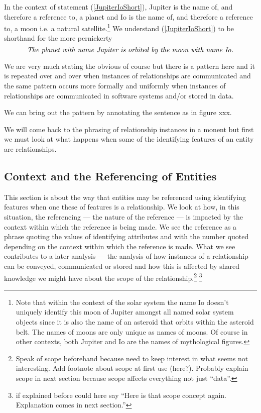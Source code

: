 In the context of statement (\ref{JupiterIoShort}), Jupiter is the name of, and therefore  a reference to, a planet and  Io is the name of, and therefore a reference to, a moon i.e. a natural satellite.\footnote{
Note that within the context of the solar system the name Io  doesn't uniquely identify this moon of Jupiter amongst all named solar system objects since it is also the name of an asteroid that orbits within the asteroid belt.
The names of moons are only unique as names of moons. 
Of course in other contexts, both Jupiter and Io are the names of mythological figures.
} 
We understand  (\ref{JupiterIoShort}) to be shorthand for the 
more pernickerty 
\begin{equation}
\mbox{\textit{The planet with name Jupiter is orbited by the moon with name Io.}}
\end{equation}

\mynote
We are very much stating the obvious of course but there is a pattern here and it is repeated over and over when instances of relationships are communicated  and the same pattern occurs more formally  and uniformly when instances of relationships are communicated in software systems and/or stored in data.

We can bring out the pattern by annotating the sentence as in figure xxx.



We will come back to the phrasing of relationship instances in a monent but first we must look at what happens when some of the identifying features of an entity are relationships.

\subsection{Context and the Referencing of Entities}
\mynote
This section is about the way that entities may be referenced using identifying features
 when one these of features is a relationship.
We look at how,  in this situation, the referencing 
--- the nature of the reference ---   
is impacted by the context within which the reference is being made. 
We see the reference as a phrase quoting the values of identifying attributes
and with the number quoted depending on 
the context within which the reference is made.
What we see contributes to a later analysis --- the analysis of  how 
instances of a relationship can be conveyed, communicated or stored and
how this is affected by shared knowledge we might have about 
the scope of  the relationship.\footnote{Speak of scope beforehand because need to keep interest in what seems not interesting. Add footnote about scope at first use (here?). Probably explain scope in next section because scope affects everything not just ``data''.} \footnote{if explained before could here say ``Here is that scope concept again. Explanation comes in next section.''}

